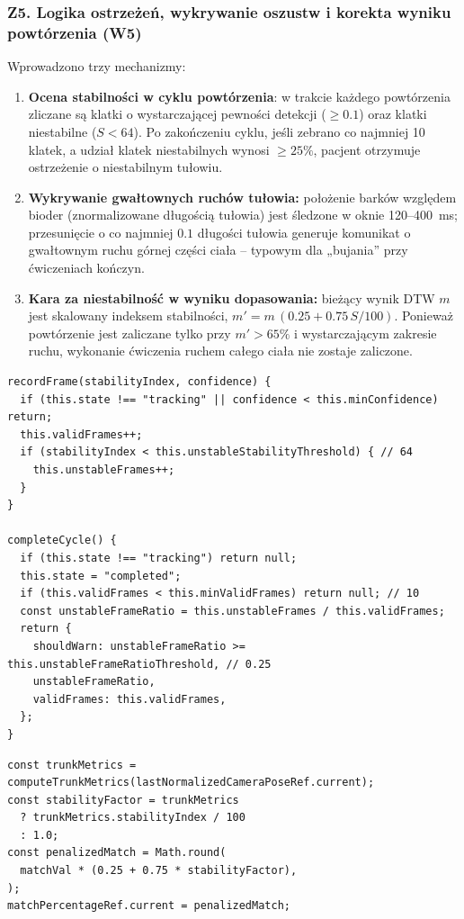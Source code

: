 \documentclass[11pt,a4paper]{article}
\begin{document}
\subsubsection{Z5. Logika ostrzeżeń, wykrywanie oszustw i korekta wyniku powtórzenia (W5)}
Wprowadzono trzy mechanizmy:
\begin{enumerate}
    \item \textbf{Ocena stabilności w cyklu powtórzenia}: w trakcie każdego powtórzenia zliczane są klatki o wystarczającej pewności detekcji ($\geq 0.1$) oraz klatki niestabilne ($S < 64$). Po zakończeniu cyklu, jeśli zebrano co najmniej 10 klatek, a udział klatek niestabilnych wynosi $\geq 25\%$, pacjent otrzymuje ostrzeżenie o niestabilnym tułowiu.
    \item \textbf{Wykrywanie gwałtownych ruchów tułowia:} położenie barków względem bioder (znormalizowane długością tułowia) jest śledzone w oknie 120--400~ms; przesunięcie o co najmniej $0.1$ długości tułowia generuje komunikat o gwałtownym ruchu górnej części ciała -- typowym dla „bujania'' przy ćwiczeniach kończyn.
    \item \textbf{Kara za niestabilność w wyniku dopasowania:} bieżący wynik DTW $m$ jest skalowany indeksem stabilności, $m' = m\,(0.25 + 0.75\,S/100)$. Ponieważ powtórzenie jest zaliczane tylko przy $m' > 65\%$ i wystarczającym zakresie ruchu, wykonanie ćwiczenia ruchem całego ciała nie zostaje zaliczone.
\end{enumerate}

\begin{lstlisting}[caption={Ocena stabilności w cyklu powtórzenia (\texttt{trunkStability.js}).}]
recordFrame(stabilityIndex, confidence) {
  if (this.state !== "tracking" || confidence < this.minConfidence) return;
  this.validFrames++;
  if (stabilityIndex < this.unstableStabilityThreshold) { // 64
    this.unstableFrames++;
  }
}

completeCycle() {
  if (this.state !== "tracking") return null;
  this.state = "completed";
  if (this.validFrames < this.minValidFrames) return null; // 10
  const unstableFrameRatio = this.unstableFrames / this.validFrames;
  return {
    shouldWarn: unstableFrameRatio >= this.unstableFrameRatioThreshold, // 0.25
    unstableFrameRatio,
    validFrames: this.validFrames,
  };
}
\end{lstlisting}

\begin{lstlisting}[caption={Obniżenie wyniku dopasowania przy niestabilnym tułowiu (\texttt{PoseDetector.js}).}]
const trunkMetrics = computeTrunkMetrics(lastNormalizedCameraPoseRef.current);
const stabilityFactor = trunkMetrics
  ? trunkMetrics.stabilityIndex / 100
  : 1.0;
const penalizedMatch = Math.round(
  matchVal * (0.25 + 0.75 * stabilityFactor),
);
matchPercentageRef.current = penalizedMatch;
\end{lstlisting}
\end{document}
